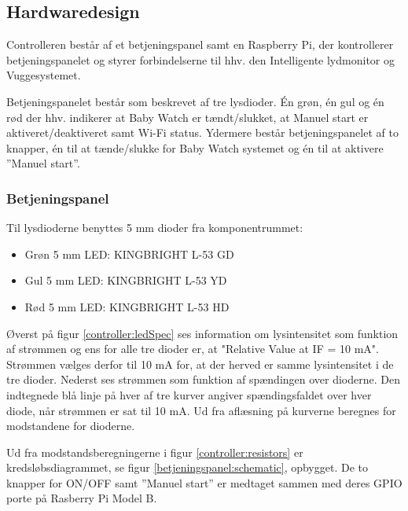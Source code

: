 \subsection{Hardwaredesign}

Controlleren består af et betjeningspanel samt en Raspberry Pi, der kontrollerer betjeningspanelet og styrer forbindelserne til hhv. den Intelligente lydmonitor og Vuggesystemet.

Betjeningspanelet består som beskrevet af tre lysdioder. Én grøn, én gul og én rød der hhv. indikerer at Baby Watch er tændt/slukket, at Manuel start er aktiveret/deaktiveret samt Wi-Fi status. Ydermere består betjeningspanelet af to knapper, én til at tænde/slukke for Baby Watch systemet og én til at aktivere ''Manuel start''.
 
\subsubsection*{Betjeningspanel}

Til lysdioderne benyttes 5 mm dioder fra komponentrummet: 

\begin{itemize}
	\item Grøn 5 mm LED: KINGBRIGHT L-53 GD
	\item Gul 5 mm LED: KINGBRIGHT L-53 YD
	\item Rød 5 mm LED: KINGBRIGHT L-53 HD
\end{itemize}



Øverst på figur \ref{controller:ledSpec} ses information om lysintensitet som funktion af strømmen og ens for alle tre dioder er, at "Relative Value at IF = 10 mA". Strømmen vælges derfor til 10 mA for, at der herved er samme lysintensitet i de tre dioder. Nederst ses strømmen som funktion af spændingen over dioderne. Den indtegnede blå linje på hver af tre kurver angiver spændingsfaldet over hver diode, når strømmen er sat til 10 mA. Ud fra aflæsning på kurverne beregnes for modstandene for dioderne.


Ud fra modstandsberegningerne i figur \ref{controller:resistors} er kredsløbsdiagrammet, se figur \ref{betjeningspanel:schematic}, opbygget. De to knapper for ON/OFF samt ''Manuel start'' er medtaget sammen med deres GPIO porte på Rasberry Pi Model B.

